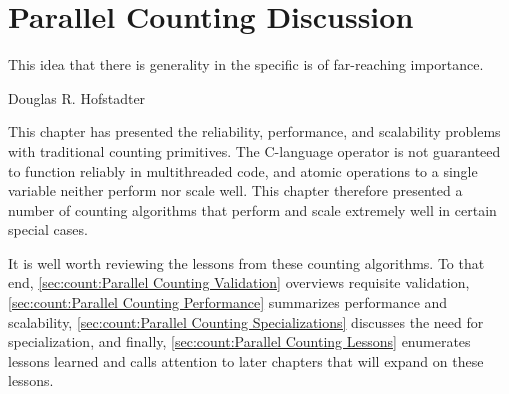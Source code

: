 \QuickQuizEnd

\section{Parallel Counting Discussion}
\label{sec:count:Parallel Counting Discussion}
%
\epigraph{This idea that there is generality in the specific is of
	  far-reaching importance.}
	 {Douglas R. Hofstadter}

This chapter has presented the reliability, performance, and
scalability problems with traditional counting primitives.
The C-language \co{++} operator is not guaranteed to function reliably in
multithreaded code, and atomic operations to a single variable neither
perform nor scale well.
This chapter therefore presented a number of counting algorithms that
perform and scale extremely well in certain special cases.

It is well worth reviewing the lessons from these counting algorithms.
To that end,
\cref{sec:count:Parallel Counting Validation}
overviews requisite validation,
\cref{sec:count:Parallel Counting Performance}
summarizes performance and scalability,
\cref{sec:count:Parallel Counting Specializations}
discusses the need for specialization,
and finally,
\cref{sec:count:Parallel Counting Lessons}
enumerates lessons learned and calls attention to later chapters that
will expand on these lessons.

